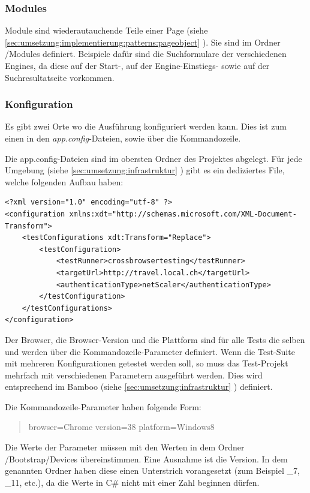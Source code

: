 \subsubsection{Modules}
Module sind wiederautauchende Teile einer Page (siehe \cref{sec:umsetzung:implementierung:patterns:pageobject} ). Sie sind im Ordner /Modules definiert. Beispiele dafür sind die Suchformulare der verschiedenen Engines, da diese auf der Start-, auf der Engine-Einstiegs- sowie auf der Suchresultatseite vorkommen.

\subsubsection{Konfiguration}
\label{sec:umsetzung:Implementierung:Architektur:Konfiguration}
Es gibt zwei Orte wo die Ausführung konfiguriert werden kann. Dies ist zum einen in den \textit{app.config}-Dateien, sowie über die Kommandozeile.

Die app.config-Dateien sind im obersten Ordner des Projektes abgelegt. Für jede Umgebung (siehe \cref{sec:umsetzung:infrastruktur} ) gibt es ein dediziertes File, welche folgenden Aufbau haben:

\lstset{language=xml}
\begin{lstlisting}
<?xml version="1.0" encoding="utf-8" ?>
<configuration xmlns:xdt="http://schemas.microsoft.com/XML-Document-Transform">
	<testConfigurations xdt:Transform="Replace">
		<testConfiguration>
			<testRunner>crossbrowsertesting</testRunner>
			<targetUrl>http://travel.local.ch</targetUrl>
			<authenticationType>netScaler</authenticationType>
		</testConfiguration>
	</testConfigurations>
</configuration>
\end{lstlisting}

Der Browser, die Browser-Version und die Plattform sind für alle Tests die selben und werden über die Kommandozeile-Parameter definiert. Wenn die Test-Suite mit mehreren Konfigurationen getestet werden soll, so muss das Test-Projekt mehrfach mit verschiedenen Parametern ausgeführt werden. Dies wird entsprechend im Bamboo (siehe \cref{sec:umsetzung:infrastruktur} ) definiert.

Die Kommandozeile-Parameter haben folgende Form:
\begin{quote}
browser=Chrome version=38 platform=Windows8
\end{quote}
Die Werte der Parameter müssen mit den Werten in dem Ordner /Bootstrap/Devices übereinstimmen. Eine Ausnahme ist die Version. In dem genannten Ordner haben diese einen Unterstrich vorangesetzt (zum Beispiel \_7, \_11, etc.), da die Werte in C\# nicht mit einer Zahl beginnen dürfen.

